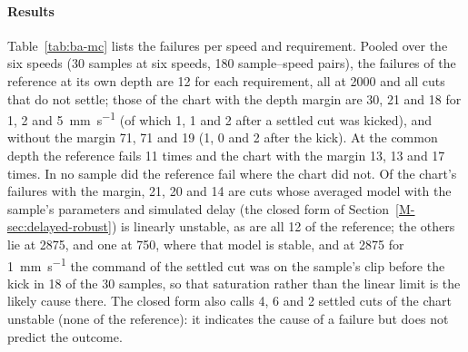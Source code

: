 
\paragraph{Results} Table~\ref{tab:ba-mc} lists the failures per speed and requirement. Pooled over the six speeds (30 samples at six speeds, 180 sample--speed pairs), the failures of the reference at its own depth are 12 for each requirement, all at \SI{2000}{\rpm} and all cuts that do not settle; those of the chart with the depth margin are 30, 21 and 18 for 1, 2 and \SI{5}{\milli\metre\per\second} (of which 1, 1 and 2 after a settled cut was kicked), and without the margin 71, 71 and 19 (1, 0 and 2 after the kick). At the common depth the reference fails 11 times and the chart with the margin 13, 13 and 17 times. In no sample did the reference fail where the chart did not. Of the chart's failures with the margin, 21, 20 and 14 are cuts whose averaged model with the sample's parameters and simulated delay (the closed form of Section~\ref{M-sec:delayed-robust}) is linearly unstable, as are all 12 of the reference; the others lie at \SI{2875}{\rpm}, and one at \SI{750}{\rpm}, where that model is stable, and at \SI{2875}{\rpm} for \SI{1}{\milli\metre\per\second} the command of the settled cut was on the sample's clip before the kick in 18 of the 30 samples, so that saturation rather than the linear limit is the likely cause there. The closed form also calls 4, 6 and 2 settled cuts of the chart unstable (none of the reference): it indicates the cause of a failure but does not predict the outcome.


